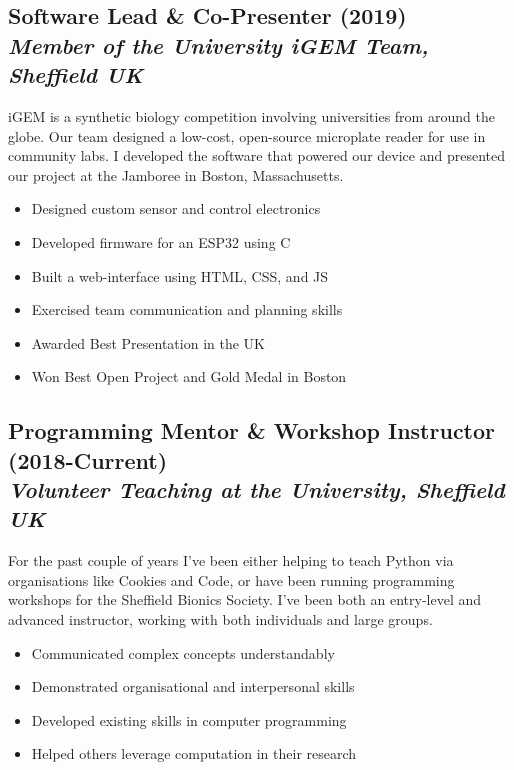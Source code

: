 \documentclass[twocolumn, a4paper, fontsize=9pt, headsepline, footsepline]{scrartcl}
\begin{document}
\subsection*{Software Lead \& Co-Presenter (2019)\\\textmd{\emph{Member of the
    University iGEM Team, Sheffield UK}}}
\noindent
iGEM is a synthetic biology competition involving universities from around the
globe. Our team designed a low-cost, open-source microplate reader for use in
community labs. I developed the software that powered our device and presented
our project at the Jamboree in Boston, Massachusetts.
\begin{itemize}
\item Designed custom sensor and control electronics
\item Developed firmware for an ESP32 using C
\item Built a web-interface using HTML, CSS, and JS
\item Exercised team communication and planning skills
\item Awarded Best Presentation in the UK
\item Won Best Open Project and Gold Medal in Boston
\end{itemize}

\subsection*{Programming Mentor \& Workshop Instructor
  (2018-Current)\\\textmd{\emph{Volunteer Teaching at the University, Sheffield UK}}}
\noindent
For the past couple of years I've been either helping to teach Python via
organisations like Cookies and Code, or have been running programming workshops
for the Sheffield Bionics Society. I've been both an entry-level and advanced
instructor, working with both individuals and large groups.
\begin{itemize}
\item Communicated complex concepts understandably
\item Demonstrated organisational and interpersonal skills
\item Developed existing skills in computer programming
\item Helped others leverage computation in their research
\end{itemize}
\end{document}
